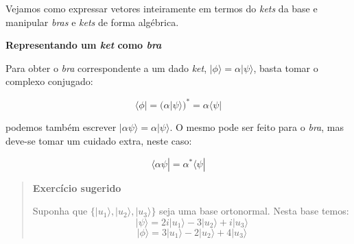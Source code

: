 \documentclass[11pt]{article}
\begin{document}
Vejamos como expressar vetores inteiramente em termos do \emph{kets} da
base e manipular \emph{bras} e \emph{kets} de forma algébrica.

\textbf{Representando um \emph{ket} como \emph{bra}}

Para obter o \emph{bra} correspondente a um dado \emph{ket},
\(| \phi\rangle = \alpha |\psi\rangle\), basta tomar o complexo
conjugado:

\[\langle \phi|  = (\alpha |\psi\rangle)^* = \alpha \langle \psi| \]

podemos também escrever \(|\alpha \psi\rangle = \alpha |\psi\rangle\). O
mesmo pode ser feito para o \emph{bra}, mas deve-se tomar um cuidado
extra, neste caso:

\[ \langle \alpha \psi| = \alpha^* \langle \psi|\]

    \begin{quote}
\textbf{Exercício sugerido}

Suponha que \(\{ |u_1 \rangle, |u_2 \rangle, |u_3 \rangle \}\) seja uma
base ortonormal. Nesta base temos:
\[| \psi \rangle = 2i |u_1 \rangle - 3|u_2 \rangle + i|u_3 \rangle\]
\[ | \phi\rangle = 3 |u_1 \rangle - 2|u_2 \rangle + 4|u_3 \rangle \]


\end{quote}
\end{document}
